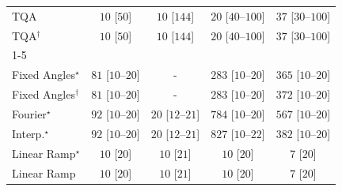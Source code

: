 \begin{tabular}{l|cccc|}
TQA & {\cellcolor[HTML]{F7FCF5}} \color[HTML]{000000} $10$ [$50$] & {\cellcolor[HTML]{F7FCF5}} \color[HTML]{000000} $10$ [$144$] & {\cellcolor[HTML]{F5FBF2}} \color[HTML]{000000} $20$ [$40$--$100$] & {\cellcolor[HTML]{F2FAEF}} \color[HTML]{000000} $37$ [$30$--$100$] \\
TQA$^\dagger$ & {\cellcolor[HTML]{F7FCF5}} \color[HTML]{000000} $10$ [$50$] & {\cellcolor[HTML]{F7FCF5}} \color[HTML]{000000} $10$ [$144$] & {\cellcolor[HTML]{F5FBF2}} \color[HTML]{000000} $20$ [$40$--$100$] & {\cellcolor[HTML]{F2FAEF}} \color[HTML]{000000} $37$ [$30$--$100$] \\
\cline{1-5}
\multicolumn{5}{c}{\rule{0pt}{8pt}SV} \\
\midrule
Fixed Angles$^\star$ & {\cellcolor[HTML]{EAF7E6}} \color[HTML]{000000} $81$ [$10$--$20$] & {\cellcolor[HTML]{000000}} \color[HTML]{F1F1F1} {\cellcolor{white}} \color{black} - & {\cellcolor[HTML]{ACDEA6}} \color[HTML]{000000} $283$ [$10$--$20$] & {\cellcolor[HTML]{8BCF89}} \color[HTML]{000000} $365$ [$10$--$20$] \\
Fixed Angles$^\dagger$ & {\cellcolor[HTML]{EAF7E6}} \color[HTML]{000000} $81$ [$10$--$20$] & {\cellcolor[HTML]{000000}} \color[HTML]{F1F1F1} {\cellcolor{white}} \color{black} - & {\cellcolor[HTML]{ACDEA6}} \color[HTML]{000000} $283$ [$10$--$20$] & {\cellcolor[HTML]{88CE87}} \color[HTML]{000000} $372$ [$10$--$20$] \\
Fourier$^\star$ & {\cellcolor[HTML]{E8F6E4}} \color[HTML]{000000} $92$ [$10$--$20$] & {\cellcolor[HTML]{F5FBF2}} \color[HTML]{000000} $20$ [$12$--$21$] & {\cellcolor[HTML]{005522}} \color[HTML]{F1F1F1} $784$ [$10$--$20$] & {\cellcolor[HTML]{339C52}} \color[HTML]{F1F1F1} $567$ [$10$--$20$] \\
Interp.$^\star$ & {\cellcolor[HTML]{E8F6E4}} \color[HTML]{000000} $92$ [$10$--$20$] & {\cellcolor[HTML]{F5FBF2}} \color[HTML]{000000} $20$ [$12$--$21$] & {\cellcolor[HTML]{00441B}} \color[HTML]{F1F1F1} $827$ [$10$--$22$] & {\cellcolor[HTML]{83CB82}} \color[HTML]{000000} $382$ [$10$--$20$] \\
Linear Ramp$^\star$ & {\cellcolor[HTML]{F7FCF5}} \color[HTML]{000000} $10$ [$20$] & {\cellcolor[HTML]{F7FCF5}} \color[HTML]{000000} $10$ [$21$] & {\cellcolor[HTML]{F7FCF5}} \color[HTML]{000000} $10$ [$20$] & {\cellcolor[HTML]{F7FCF5}} \color[HTML]{000000} $7$ [$20$] \\
Linear Ramp & {\cellcolor[HTML]{F7FCF5}} \color[HTML]{000000} $10$ [$20$] & {\cellcolor[HTML]{F7FCF5}} \color[HTML]{000000} $10$ [$21$] & {\cellcolor[HTML]{F7FCF5}} \color[HTML]{000000} $10$ [$20$] & {\cellcolor[HTML]{F7FCF5}} \color[HTML]{000000} $7$ [$20$] \\

\end{tabular}

